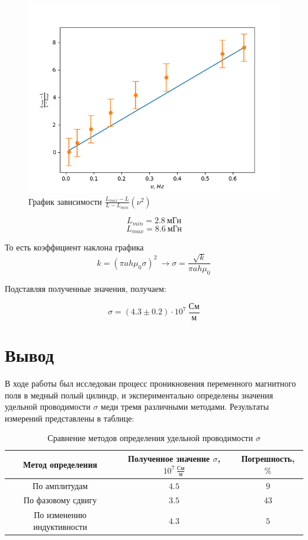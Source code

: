 \documentclass[a4paper]{article}
\begin{document}
\begin{figure}[h!]
    \centering
    \includegraphics[width=0.6\pdfpagewidth]{graph2.png}
    \caption{График зависимости $\frac{L_{max} - L}{L - L_{min}}(\nu^2)$}
\end{figure}

\begin{equation*}
    L_{min} = 2.8 ~ \text{мГн}
\end{equation*}
\begin{equation*}
    L_{max} = 8.6 ~ \text{мГн}
\end{equation*}

	
То есть коэффициент наклона графика
\[k = (\pi ah\mu_0 \sigma)^2 \ \rightarrow \sigma = \frac{\sqrt{k}}{\pi ah \mu_0}\]

Подставляя полученные значения, получаем:

\begin{equation}
    \sigma = (4.3 \pm 0.2) \cdot 10^7  \ \frac{\text{См}}{\text{м}}
\end{equation}

\section{Вывод}

В ходе работы был исследован процесс проникновения переменного магнитного поля в медный полый цилиндр, и экспериментально определены значения удельной проводимости $\sigma$ меди тремя различными методами. Результаты измерений представлены в таблице:

\begin{table}[h!]
    \centering
    \begin{tabular}{|c|c|c|}
        \hline
        \textbf{Метод определения} & \textbf{Полученное значение $\sigma$, $10^7 \, \frac{\text{См}}{\text{м}}$} & \textbf{Погрешность, $\%$} \\ \hline
        По амплитудам & $4.5$ & $9$ \\ \hline
        По фазовому сдвигу & $3.5$ & $43$ \\ \hline
        По изменению индуктивности & $4.3$ & $5$ \\ \hline
    \end{tabular}
    \caption{Сравнение методов определения удельной проводимости $\sigma$}
\end{table}
\end{document}
